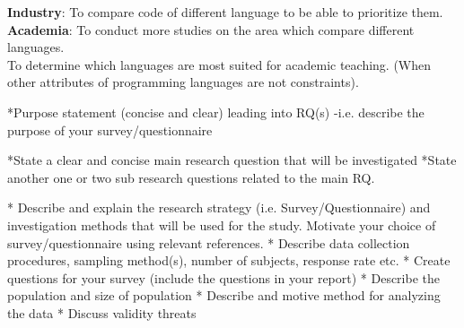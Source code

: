\documentclass[times, 10pt,twocolumn]{IEEEtran}
\begin{document}
\textbf{Industry}: To compare code of different language to be able to prioritize them. \\
\textbf{Academia}: To conduct more studies on the area which compare different languages. \\
To determine which languages are most suited for academic teaching. (When other attributes of programming languages are not constraints).



*Purpose statement (concise  and clear)  leading into  RQ(s)
 -i.e.  describe  the purpose of  your  survey/questionnaire

*State a clear and concise main  research  question  that  will  be  investigated
*State another one or  two sub research  questions related to  the main  RQ.



* Describe  and explain the research  strategy (i.e.  Survey/Questionnaire)
and investigation methods that  will  be  used  for the study.  Motivate  your  
choice  of  survey/questionnaire  using relevant  references.
* Describe  data  collection  procedures, sampling  method(s),  number  of  
subjects, response  rate  etc.
* Create  questions for your  survey  (include  the questions in  your  report)
* Describe  the population  and size  of  population
* Describe  and motive  method  for analyzing the data
* Discuss validity  threats





\end{document}
